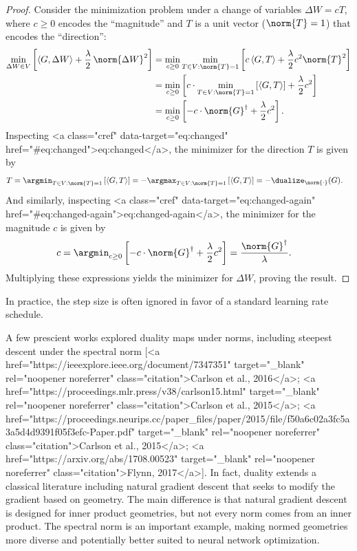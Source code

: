\begin{proof}
    Consider the minimization problem under a change of variables $\Delta W = c T$, where $c \geq 0$ encodes the “magnitude” and $T$ is a unit vector ($\norm{T}=1$) that encodes the “direction”:
    \begin{align}
        \min_{\Delta W \in V} \left[\langle G, \Delta W \rangle + \frac{\lambda}{2} \, \norm{\Delta W}^2 \right] &= \min_{c \geq 0} \min_{T\in V : \norm{T}=1} \left[c \,\langle G, T \rangle + \frac{\lambda}{2} c^2 \norm{T}^2 \right] \\
        &= \min_{c \geq 0} \left[c \cdot \min_{T\in V : \norm{T}=1} \left[\langle G, T \rangle \right] + \frac{\lambda}{2} c^2 \right] \label{eq:changed} \\
        &= \min_{c \geq 0} \left[ -c \cdot \norm{G}^\dagger + \frac{\lambda}{2} c^2 \right]. \label{eq:changed-again}
    \end{align}
    Inspecting <a class="cref" data-target="eq:changed" href="#eq:changed">eq:changed</a>, the minimizer for the direction $T$ is given by
    \begin{align}
        T &= \argmin_{T\in V : \norm{T}=1} \left[\langle G, T \rangle\right] = - \argmax_{T\in V : \norm{T}=1} \left[\langle G, T \rangle\right] = -\dualize_{\norm{\cdot}}(G).
    \end{align}
    And similarly, inspecting <a class="cref" data-target="eq:changed-again" href="#eq:changed-again">eq:changed-again</a>, the minimizer for the magnitude $c$ is given by
    \begin{align}
        c &= \argmin_{c \geq 0} \left[ - c \cdot \norm{G}^\dagger + \frac{\lambda}{2} c^2 \right] = \frac{\norm{G}^\dagger}{\lambda}.
    \end{align}
    Multiplying these expressions yields the minimizer for $\Delta W$, proving the result.
\end{proof}

In practice, the step size is often ignored in favor of a standard learning rate schedule.

A few prescient works explored duality maps under norms, including steepest descent under the spectral norm [<a href="https://ieeexplore.ieee.org/document/7347351" target="_blank" rel="noopener noreferrer" class="citation">Carlson et al., 2016</a>; <a href="https://proceedings.mlr.press/v38/carlson15.html" target="_blank" rel="noopener noreferrer" class="citation">Carlson et al., 2015</a>; <a href="https://proceedings.neurips.cc/paper_files/paper/2015/file/f50a6c02a3fc5a3a5d4d9391f05f3efc-Paper.pdf" target="_blank" rel="noopener noreferrer" class="citation">Carlson et al., 2015</a>; <a href="https://arxiv.org/abs/1708.00523" target="_blank" rel="noopener noreferrer" class="citation">Flynn, 2017</a>]. In fact, duality extends a classical literature including natural gradient descent that seeks to modify the gradient based on geometry. The main difference is that natural gradient descent is designed for inner product geometries, but not every norm comes from an inner product. The spectral norm is an important example, making normed geometries more diverse and potentially better suited to neural network optimization.

